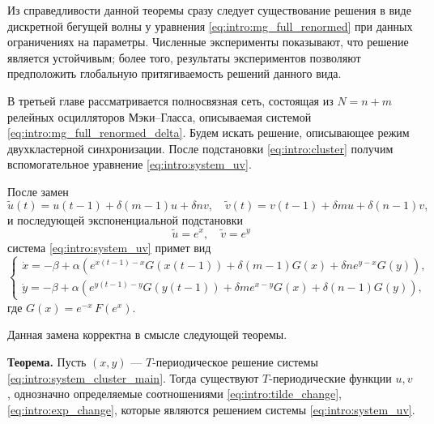 Из справедливости данной теоремы сразу следует существование решения в виде дискретной бегущей волны у уравнения \eqref{eq:intro:mg_full_renormed} при данных ограничениях на параметры. Численные эксперименты показывают, что решение является устойчивым; более того, результаты экспериментов позволяют предположить глобальную притягиваемость решений данного вида.

\bigskip

В третьей главе рассматривается полносвязная сеть, состоящая из $N = n + m$ релейных осцилляторов Мэки--Гласса, описываемая системой \eqref{eq:intro:mg_full_renormed_delta}. Будем искать решение, описывающее режим двухкластерной синхронизации. После подстановки \eqref{eq:intro:cluster} получим вспомогательное уравнение \eqref{eq:intro:system_uv}.

После замен
\begin{equation}
	\label{eq:intro:tilde_change}
	\tilde{u}(t) = u(t - 1) + \delta (m - 1) u + \delta n v, \quad \tilde{v}(t) = v(t - 1) + \delta m u + \delta (n - 1) v,
\end{equation}
%
и последующей экспоненциальной подстановки
\begin{equation}
	\label{eq:intro:exp_change}
	\tilde{u} = e^x, \quad \tilde{v} = e^y
\end{equation}
%
система \eqref{eq:intro:system_uv} примет вид
%
\begin{equation}
	\label{eq:intro:system_cluster_main}
	\begin{cases}
		\dot{x} = -\beta + \alpha \left(e^{x(t - 1) - x} G(x(t - 1)) + \delta (m - 1) G(x) + \delta n e^{y - x} G(y)\right),\\
		\dot{y} = -\beta + \alpha \left(e^{y(t - 1) - y} G(y(t - 1)) + \delta m e^{x - y} G(x) + \delta (n - 1) G(y)\right),
	\end{cases}
\end{equation}
где $G(x) = e^{-x} \, F(e^x)$.

Данная замена корректна в смысле следующей теоремы.

\textbf{Теорема.} Пусть $(x, y)$ --- $T$-периодическое решение системы \eqref{eq:intro:system_cluster_main}. Тогда существуют $T$-периодические функции $u, v$, однозначно определяемые соотношениями \eqref{eq:intro:tilde_change}, \eqref{eq:intro:exp_change}, которые являются решением системы \eqref{eq:intro:system_uv}.

